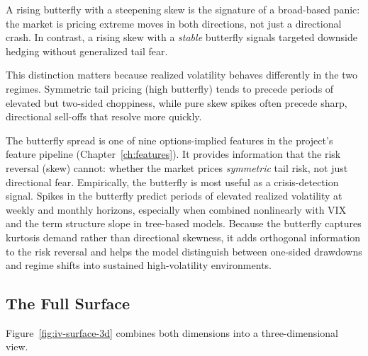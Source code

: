 A rising butterfly with a steepening skew is the signature of a broad-based panic: the market is pricing extreme moves in both directions, not just a directional crash.
In contrast, a rising skew with a \emph{stable} butterfly signals targeted downside hedging without generalized tail fear.

This distinction matters because realized volatility behaves differently in the two regimes.
Symmetric tail pricing (high butterfly) tends to precede periods of elevated but two-sided choppiness, while pure skew spikes often precede sharp, directional sell-offs that resolve more quickly.

\begin{projectconnection}
The butterfly spread is one of nine options-implied features in the project's feature pipeline (Chapter~\ref{ch:features}).
It provides information that the risk reversal (skew) cannot: whether the market prices \emph{symmetric} tail risk, not just directional fear.
Empirically, the butterfly is most useful as a crisis-detection signal.
Spikes in the butterfly predict periods of elevated realized volatility at weekly and monthly horizons, especially when combined nonlinearly with VIX and the term structure slope in tree-based models.
Because the butterfly captures kurtosis demand rather than directional skewness, it adds orthogonal information to the risk reversal and helps the model distinguish between one-sided drawdowns and regime shifts into sustained high-volatility environments.
\end{projectconnection}

\subsection{The Full Surface}
\label{sec:full-surface}

Figure~\ref{fig:iv-surface-3d} combines both dimensions into a three-dimensional view.

